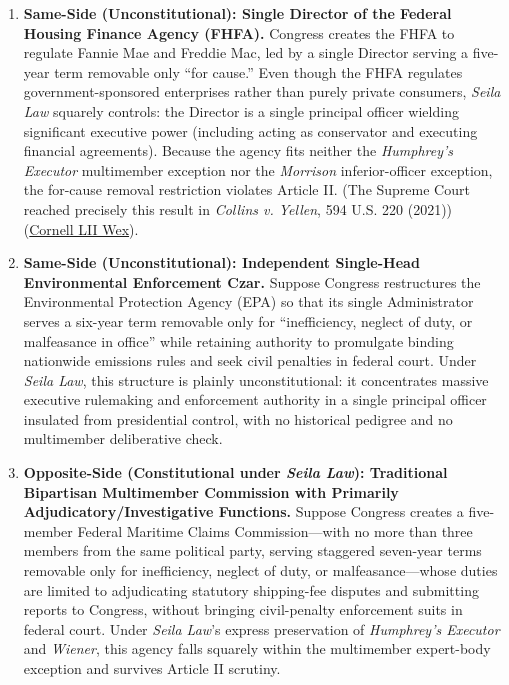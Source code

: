 \documentclass[12pt]{article}
\begin{document}
\begin{enumerate}
\item \textbf{Same-Side (Unconstitutional): Single Director of the Federal Housing Finance Agency (FHFA).} Congress creates the FHFA to regulate Fannie Mae and Freddie Mac, led by a single Director serving a five-year term removable only ``for cause.'' Even though the FHFA regulates government-sponsored enterprises rather than purely private consumers, \textit{Seila Law} squarely controls: the Director is a single principal officer wielding significant executive power (including acting as conservator and executing financial agreements). Because the agency fits neither the \textit{Humphrey's Executor} multimember exception nor the \textit{Morrison} inferior-officer exception, the for-cause removal restriction violates Article II. (The Supreme Court reached precisely this result in \textit{Collins v. Yellen}, 594 U.S. 220 (2021)) (\href{https://www.law.cornell.edu/wex/unitary_executive_theory_\%28uet\%29}{Cornell LII Wex}).

\item \textbf{Same-Side (Unconstitutional): Independent Single-Head Environmental Enforcement Czar.} Suppose Congress restructures the Environmental Protection Agency (EPA) so that its single Administrator serves a six-year term removable only for ``inefficiency, neglect of duty, or malfeasance in office'' while retaining authority to promulgate binding nationwide emissions rules and seek civil penalties in federal court. Under \textit{Seila Law}, this structure is plainly unconstitutional: it concentrates massive executive rulemaking and enforcement authority in a single principal officer insulated from presidential control, with no historical pedigree and no multimember deliberative check.

\item \textbf{Opposite-Side (Constitutional under \textit{Seila Law}): Traditional Bipartisan Multimember Commission with Primarily Adjudicatory/Investigative Functions.} Suppose Congress creates a five-member Federal Maritime Claims Commission---with no more than three members from the same political party, serving staggered seven-year terms removable only for inefficiency, neglect of duty, or malfeasance---whose duties are limited to adjudicating statutory shipping-fee disputes and submitting reports to Congress, without bringing civil-penalty enforcement suits in federal court. Under \textit{Seila Law}'s express preservation of \textit{Humphrey's Executor} and \textit{Wiener}, this agency falls squarely within the multimember expert-body exception and survives Article II scrutiny.


\end{enumerate}
\end{document}
